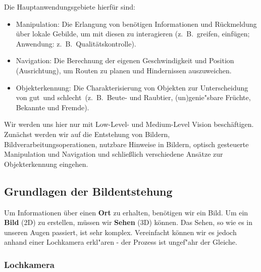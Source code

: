 Die Hauptanwendungsgebiete hierfür sind:
\begin{itemize}
\item Manipulation: Die Erlangung von benötigen Informationen und Rückmeldung über lokale Gebilde, um mit diesen zu interagieren (z.~B.\ greifen, einfügen; Anwendung: z.~B.\ Qualitätskontrolle).
\item Navigation: Die Berechnung der eigenen Geschwindigkeit und Position (Ausrichtung), um Routen zu planen und Hindernissen auszuweichen.
\item Objekterkennung: Die Charakterisierung von Objekten zur Unterscheidung von \glqq gut\grqq\ und \glqq schlecht\grqq\ (z.~B.\ Beute- und Raubtier, (un)genie"sbare Früchte, Bekannte und Fremde).
\end{itemize}

Wir werden uns hier nur mit Low-Level- und Medium-Level Vision beschäftigen.
Zunächst werden wir auf die Entstehung von Bildern, Bildverarbeitungsoperationen, nutzbare Hinweise in Bildern, optisch gesteuerte Manipulation und Navigation und schließlich verschiedene Ansätze zur Objekterkennung eingehen.

\subsection{Grundlagen der Bildentstehung}

Um Informationen über einen \textbf{Ort} zu erhalten, benötigen wir ein Bild. Um ein \textbf{Bild} (2D) zu erstellen, müssen wir \textbf{Sehen} (3D) können. Das Sehen, so wie es in unseren Augen passiert, ist sehr komplex. Vereinfacht können wir es jedoch  anhand einer Lochkamera erkl"aren - der Prozess ist ungef"ahr der Gleiche.

\subsubsection{Lochkamera}


